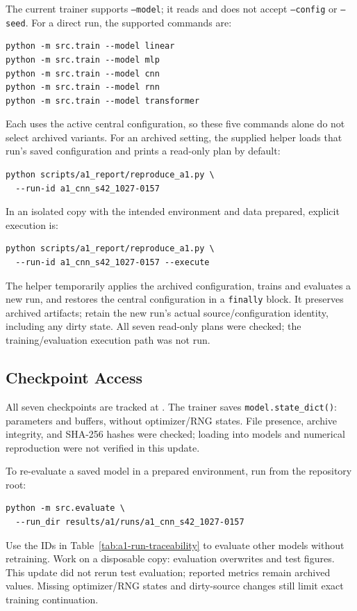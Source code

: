 The current trainer supports \texttt{--model}; it reads  and does not accept \texttt{--config} or \texttt{--seed}. For a direct run, the supported commands are:
\begin{verbatim}
python -m src.train --model linear
python -m src.train --model mlp
python -m src.train --model cnn
python -m src.train --model rnn
python -m src.train --model transformer
\end{verbatim}
Each uses the active central configuration, so these five commands alone do not select archived variants. For an archived setting, the supplied helper loads that run's saved configuration and prints a read-only plan by default:
\begin{verbatim}
python scripts/a1_report/reproduce_a1.py \
  --run-id a1_cnn_s42_1027-0157
\end{verbatim}
In an isolated copy with the intended environment and data prepared, explicit execution is:
\begin{verbatim}
python scripts/a1_report/reproduce_a1.py \
  --run-id a1_cnn_s42_1027-0157 --execute
\end{verbatim}
The helper temporarily applies the archived configuration, trains and evaluates a new run, and restores the central configuration in a \texttt{finally} block. It preserves archived artifacts; retain the new run's actual source/configuration identity, including any dirty state. All seven read-only plans were checked; the training/evaluation execution path was not run.

\subsection{Checkpoint Access}

All seven checkpoints are tracked at . The trainer saves \texttt{model.state\_dict()}: parameters and buffers, without optimizer/RNG states. File presence, archive integrity, and SHA-256 hashes were checked; loading into models and numerical reproduction were not verified in this update.

To re-evaluate a saved model in a prepared environment, run from the repository root:
\begin{verbatim}
python -m src.evaluate \
  --run_dir results/a1/runs/a1_cnn_s42_1027-0157
\end{verbatim}
Use the IDs in Table~\ref{tab:a1-run-traceability} to evaluate other models without retraining. Work on a disposable copy: evaluation overwrites  and test figures. This update did not rerun test evaluation; reported metrics remain archived values. Missing optimizer/RNG states and dirty-source changes still limit exact training continuation.

